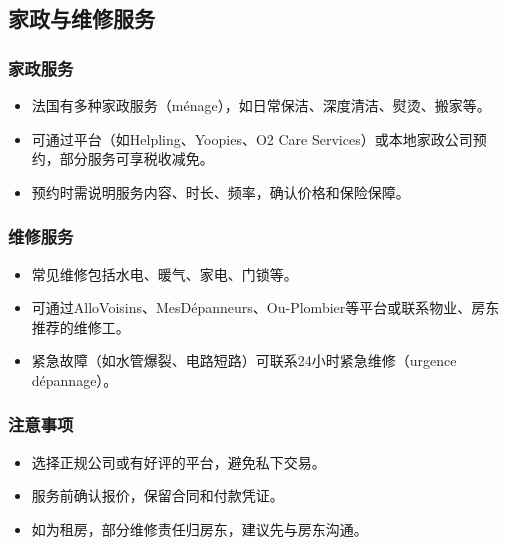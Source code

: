 \subsection{家政与维修服务}

\subsubsection{家政服务}
\begin{itemize}
    \item 法国有多种家政服务（ménage），如日常保洁、深度清洁、熨烫、搬家等。
    \item 可通过平台（如Helpling、Yoopies、O2 Care Services）或本地家政公司预约，部分服务可享税收减免。
    \item 预约时需说明服务内容、时长、频率，确认价格和保险保障。
\end{itemize}

\subsubsection{维修服务}
\begin{itemize}
    \item 常见维修包括水电、暖气、家电、门锁等。
    \item 可通过AlloVoisins、MesDépanneurs、Ou-Plombier等平台或联系物业、房东推荐的维修工。
    \item 紧急故障（如水管爆裂、电路短路）可联系24小时紧急维修（urgence dépannage）。
\end{itemize}

\subsubsection{注意事项}
\begin{itemize}
    \item 选择正规公司或有好评的平台，避免私下交易。
    \item 服务前确认报价，保留合同和付款凭证。
    \item 如为租房，部分维修责任归房东，建议先与房东沟通。
\end{itemize}

